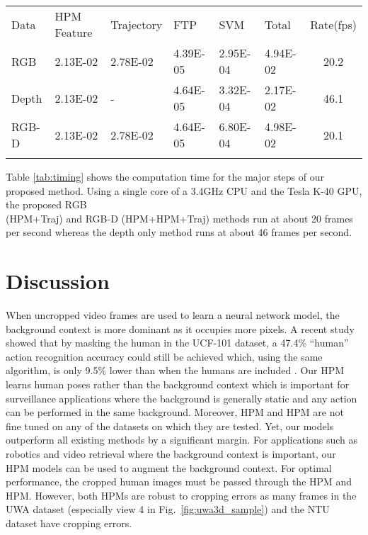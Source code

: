 \documentclass[twocolumn]{svjour3}          \smartqed  \usepackage{graphicx}
\begin{document}
\begin{table*}
\begin{center}
\caption{Execution time in seconds for the proposed method}
\label{tab:timing}
\begin{tabular}{llllllc}
\hline\noalign{\smallskip}
Data & \multicolumn{1}{l}{HPM Feature} & Trajectory & \multicolumn{1}{l}{FTP} & \multicolumn{1}{l}{SVM} & \multicolumn{1}{l}{Total} & \multicolumn{1}{l}{Rate(fps)} \\
\noalign{\smallskip}\hline\noalign{\smallskip}
RGB & 2.13E-02 & \multicolumn{1}{l}{2.78E-02} & 4.39E-05 & 2.95E-04 & 4.94E-02 & 20.2 \\
Depth & 2.13E-02 & - & 4.64E-05 & 3.32E-04 & 2.17E-02 & 46.1 \\
RGB-D & 2.13E-02 & \multicolumn{1}{l}{2.78E-02} & 4.64E-05 & 6.80E-04 & 4.98E-02 & 20.1 \\
\hline\noalign{\smallskip}
\end{tabular}
\end{center}
\end{table*}


Table \ref{tab:timing} shows the computation time for the major steps of our proposed method. Using a single core of a 3.4GHz CPU and the Tesla K-40 GPU, the proposed RGB \\ (HPM+Traj) and RGB-D (HPM+HPM+Traj) methods run at about 20 frames per second whereas the depth only method runs at about 46 frames per second. 

\section{Discussion}
\label{sec:disc}

When uncropped video frames are used to learn a neural network model, the background context is more dominant as it occupies more pixels. A recent study showed that by masking the human in the UCF-101 dataset, a 47.4\% ``human'' action recognition accuracy could still be achieved which, using the same algorithm, is only 9.5\% lower than when the humans are included \citep{he2016human}. Our HPM learns human poses rather than the background context which is important for surveillance applications where the background is generally static and any action can be performed in the same background. Moreover, HPM and HPM are not fine tuned on any of the datasets on which they are tested. Yet, our models outperform all existing methods by a significant margin. For applications such as robotics and video retrieval where the background context is important, our HPM models can be used to augment the background context. For optimal performance, the cropped human images must be passed through the HPM and HPM. However, both HPMs are robust to cropping errors as many frames in the UWA dataset (especially view 4 in Fig.~\ref{fig:uwa3d_sample}) and the NTU dataset have cropping errors.
\end{document}
